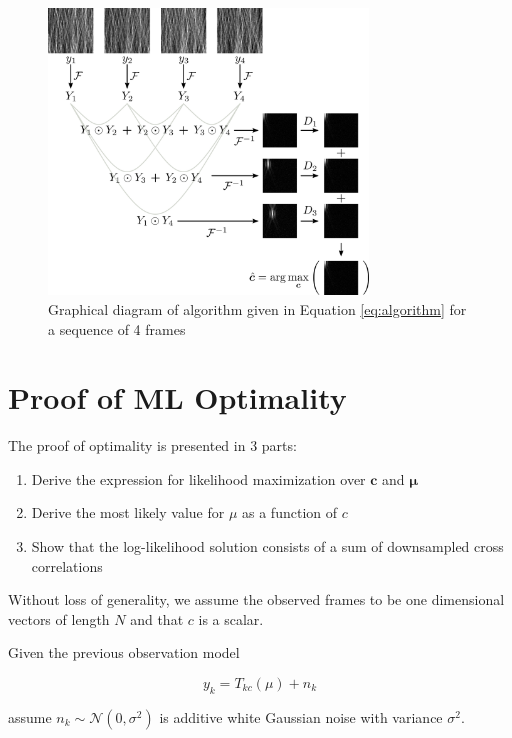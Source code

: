 \documentclass{article}
\begin{document}
\begin{figure}[htb]
  \begin{minipage}[b]{1\linewidth}
    \centering
    \centerline{\includegraphics[width=8.5cm]{images/algorithm.png}}
  \end{minipage}
  \caption{Graphical diagram of algorithm given in Equation \ref{eq:algorithm} for a sequence of 4 frames}
  \label{fig:algorithm}
\end{figure}

\section{Proof of ML Optimality}
\label{sec:optimality}

The proof of optimality is presented in 3 parts:

\begin{enumerate}
\item Derive the expression for likelihood maximization over $\bm{c}$ and $\bm{\mu}$
\item Derive the most likely value for $\mu$ as a function of $c$
\item Show that the log-likelihood solution consists of a sum of downsampled cross correlations
\end{enumerate}

Without loss of generality, we assume the observed frames to be one dimensional vectors of length $N$ and that $c$ is a scalar.

Given the previous observation model

\begin{equation}
y_k = T_{kc}(\mu) + n_k
\end{equation}

assume $n_k \sim \mathcal{N}(0, \sigma^2)$ is additive white Gaussian noise with variance $\sigma^2$.
\end{document}
